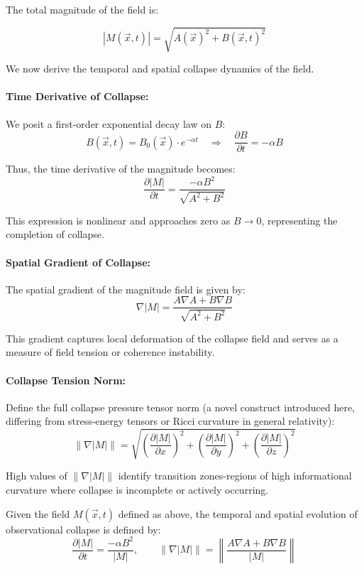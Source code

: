 The total magnitude of the field is:

\[
|M(\vec{x}, t)| = \sqrt{A(\vec{x})^2 + B(\vec{x}, t)^2}
\]

We now derive the temporal and spatial collapse dynamics of the field. \cite{imaginary_meta} 

\paragraph{Time Derivative of Collapse:}

We posit a first-order exponential decay law on $B$:
\[
B(\vec{x}, t) = B_0(\vec{x}) \cdot e^{-\alpha t}
\quad \Rightarrow \quad
\frac{\partial B}{\partial t} = -\alpha B
\]

Thus, the time derivative of the magnitude becomes:
\[
\frac{\partial |M|}{\partial t} = \frac{-\alpha B^2}{\sqrt{A^2 + B^2}}
\]

This expression is nonlinear and approaches zero as $B \rightarrow 0$, representing the completion of collapse. \cite{imaginary_meta} 

\paragraph{Spatial Gradient of Collapse:}

The spatial gradient of the magnitude field is given by:
\[
\nabla |M| = \frac{A \nabla A + B \nabla B}{\sqrt{A^2 + B^2}}
\]

This gradient captures local deformation of the collapse field and serves as a measure of field tension or coherence instability. \cite{imaginary_meta} 

\paragraph{Collapse Tension Norm:}

Define the full collapse pressure tensor norm (a novel construct introduced here, differing from stress-energy tensors or Ricci curvature in general relativity):
\[
\|\nabla |M|\| = \sqrt{ \left( \frac{\partial |M|}{\partial x} \right)^2 + \left( \frac{\partial |M|}{\partial y} \right)^2 + \left( \frac{\partial |M|}{\partial z} \right)^2 }
\]

High values of $\|\nabla |M|\|$ identify transition zones-regions of high informational curvature where collapse is incomplete or actively occurring. \cite{imaginary_meta} 

\begin{theorem}
Given the field $M(\vec{x}, t)$ defined as above, the temporal and spatial evolution of observational collapse is defined by:
\[
\frac{\partial |M|}{\partial t} = \frac{-\alpha B^2}{|M|}, \qquad
\|\nabla |M|\| = \left\| \frac{A \nabla A + B \nabla B}{|M|} \right\|
\]
\end{theorem}

